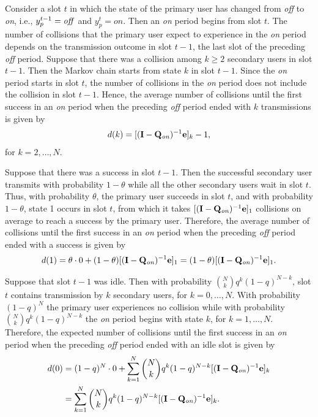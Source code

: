 \documentclass[12pt,draftclsnofoot,onecolumn]{IEEEtran}
\begin{document}
Consider a slot $t$ in which the state of the primary user has changed from \emph{off} to \emph{on},
i.e., $y_p^{t-1} = \textrm{\emph{off}}$ and $y_p^t = on$.
Then an \emph{on} period begins from slot $t$.
The number of collisions that the primary user
expect to experience in the \emph{on} period depends on the transmission outcome in slot $t-1$,
the last slot of the preceding \emph{off} period.
Suppose that there was a collision among $k \geq 2$ secondary users in slot $t-1$.
Then the Markov chain starts from state $k$ in slot $t-1$.
Since the \emph{on} period starts in slot $t$, the number of collisions in the \emph{on} period does not include
the collision in slot $t-1$. Hence, the average number of collisions
until the first success in an \emph{on} period when the preceding \emph{off} period
ended with $k$ transmissions is given by
\begin{align*}
d(k) = [ (\mathbf{I} - \mathbf{Q}_{\textrm{\emph{on}}})^{-1} \mathbf{e} ]_k - 1,
\end{align*}
for $k = 2, \ldots, N$.

Suppose that there was a success in slot $t-1$. Then the successful secondary user transmits
with probability $1-\theta$ while all the other secondary users wait in slot $t$.
Thus, with probability $\theta$, the primary user succeeds in slot $t$,
and with probability $1-\theta$, state 1 occurs in slot $t$, from which
it takes $[ (\mathbf{I} - \mathbf{Q}_{\textrm{\emph{on}}})^{-1} \mathbf{e} ]_1$ collisions
on average to reach a success by the primary user. Therefore,
the average number of collisions
until the first success in an \emph{on} period when the preceding \emph{off} period
ended with a success is given by
\begin{align} \label{eq:d1}
d(1) = \theta \cdot 0 + (1-\theta)  [ (\mathbf{I} - \mathbf{Q}_{\textrm{\emph{on}}})^{-1} \mathbf{e} ]_1
= (1-\theta)  [ (\mathbf{I} - \mathbf{Q}_{\textrm{\emph{on}}})^{-1} \mathbf{e} ]_1.
\end{align}

Suppose that slot $t-1$ was idle. Then
with probability $\binom{N}{k} q^k (1-q)^{N-k}$, slot $t$ contains transmission by $k$ secondary users, for $k = 0, \ldots, N$.
With probability $(1-q)^N$ the primary user experiences no collision while
with probability $\binom{N}{k} q^k (1-q)^{N-k}$ the \emph{on} period begins with state $k$,
for $k = 1,\ldots, N$. Therefore,
the expected number of collisions
until the first success in an \emph{on} period when the preceding \emph{off} period
ended with an idle slot is given by
\begin{align*}
d(0) &= (1-q)^N \cdot 0 + \sum_{k=1}^N \binom{N}{k} q^k (1-q)^{N-k} [ (\mathbf{I} - \mathbf{Q}_{\textrm{\emph{on}}})^{-1} \mathbf{e} ]_k\\
&= \sum_{k=1}^N \binom{N}{k} q^k (1-q)^{N-k} [ (\mathbf{I} - \mathbf{Q}_{\textrm{\emph{on}}})^{-1} \mathbf{e} ]_k.
\end{align*}
\end{document}
